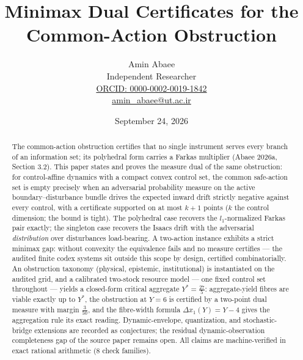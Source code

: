 \documentclass[10pt,twocolumn]{article}
\theoremstyle{definition}
\begin{document}
\title{Minimax Dual Certificates for the\\ Common-Action Obstruction}
\author{Amin Abaee\\[0.35em]
{\small Independent Researcher}\\[0.55em]
{\small\href{https://orcid.org/0000-0002-0019-1842}{ORCID: 0000-0002-0019-1842}}\\[0.3em]
{\small\href{mailto:amin\_abaee@ut.ac.ir}{amin\_abaee@ut.ac.ir}}}
\date{September 24, 2026}
\maketitle

\begin{abstract}
The common-action obstruction certifies that no single instrument serves
every branch of an information set; its polyhedral form carries a Farkas
multiplier (Abaee 2026a, Section 3.2). This paper states and proves the
measure dual of the same obstruction: for control-affine dynamics with a
compact convex control set, the common safe-action set is empty precisely
when an adversarial probability measure on the active
boundary--disturbance bundle drives the expected inward drift strictly
negative against every control, with a certificate supported on at most
$k+1$ points ($k$ the control dimension; the bound is tight). The
polyhedral case recovers the $l_1$-normalized Farkas pair exactly; the
singleton case recovers the Isaacs drift with the adversarial
\emph{distribution} over disturbances load-bearing. A two-action instance
exhibits a strict minimax gap: without convexity the equivalence fails and
no measure certifies --- the audited finite codex systems sit outside this
scope by design, certified combinatorially. An obstruction taxonomy
(physical, epistemic, institutional) is instantiated on the audited grid,
and a calibrated two-stock resource model --- one fixed control set
throughout --- yields a closed-form critical aggregate
$Y^{*} = \tfrac{27}{5}$: aggregate-yield fibres are viable exactly up to
$Y^{*}$, the obstruction at $Y = 6$ is certified by a two-point dual
measure with margin $\tfrac{3}{50}$, and the fibre-width formula
$\Delta x_{1}(Y) = Y - 4$ gives the aggregation rule its exact reading.
Dynamic-envelope, quantization, and stochastic-bridge extensions are
recorded as conjectures; the residual dynamic-observation completeness gap
of the source paper remains open. All claims are machine-verified in exact
rational arithmetic (8 check families).
\end{abstract}
\end{document}
